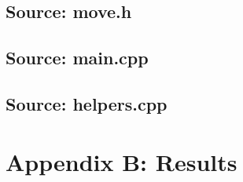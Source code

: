 \documentclass[a4paper]{article}
\begin{document}
\subsection{{Source: move.h}}


\subsection{{Source: main.cpp}}


\subsection{{Source: helpers.cpp}}


\break
\section*{Appendix B: Results}
\end{document}
